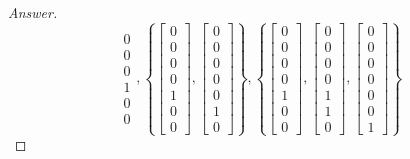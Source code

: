 \documentclass{article}
\newcommand{\bracks}[1]{\left\{#1\right\}}
\newcommand{\sqbracks}[1]{\left[#1\right]}
\begin{document}
\begin{proof}[Answer]
$${{\begin{matrix}
            0 \\
            0 \\
            0 \\
            1 \\
            0 \\
            0 
            \end{matrix}}},             
            \bracks{\sqbracks{\begin{matrix}
            0 \\
            0 \\
            0 \\
            0 \\
            1 \\
            0 \\
            0 
            \end{matrix}}, \sqbracks{\begin{matrix}
            0 \\
            0 \\
            0 \\
            0 \\
            0 \\
            1 \\
            0 
            \end{matrix}}},
            \bracks{\sqbracks{\begin{matrix}
            0 \\
            0 \\
            0 \\
            0 \\
            1 \\
            0 \\
            0 
            \end{matrix}}, \sqbracks{\begin{matrix}
            0 \\
            0 \\
            0 \\
            0 \\
            1 \\
            1 \\
            0 
            \end{matrix}},
            \sqbracks{\begin{matrix}
            0 \\
            0 \\
            0 \\
            0 \\
            0 \\
            0 \\
            1 
            \end{matrix}}}$$ 

            \end{proof}
\end{document}
